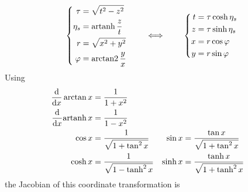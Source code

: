 \begin{equation}
    \left\{
    \begin{split}
        \tau&=\sqrt{t^2-z^2}\\
        \eta_s&={\text{artanh}\,}\frac{z}{t}\\
        r&=\sqrt{x^2+y^2}\\
        \varphi&={\text{arctan2}\,}\frac{y}{x}
    \end{split}
    \right.\qquad\iff\qquad
    \left\{
    \begin{split}
        t&=\tau\cosh\eta_s\\
        z&=\tau\sinh\eta_s\\
        x&=r\cos\varphi\\
        y&=r\sin\varphi
    \end{split}
    \right.
\end{equation}
Using
\begin{align*}
    \frac{\text{d}}{\text{d} x}\arctan x & =\frac{1}{1+x^2}                                                              \\
    \frac{\text{d}}{\text{d} x}{\text{artanh}\,} x & =\frac{1}{1-x^2}                                                              \\
    \cos x                     & =\frac{1}{\sqrt{1+\tan^2 x}}  & \sin x  & =\frac{\tan x}{\sqrt{1+\tan^2 x}}   \\
    \cosh x                    & =\frac{1}{\sqrt{1-\tanh^2 x}} & \sinh x & =\frac{\tanh x}{\sqrt{1+\tanh^2 x}}
\end{align*}
the Jacobian of this coordinate transformation is

